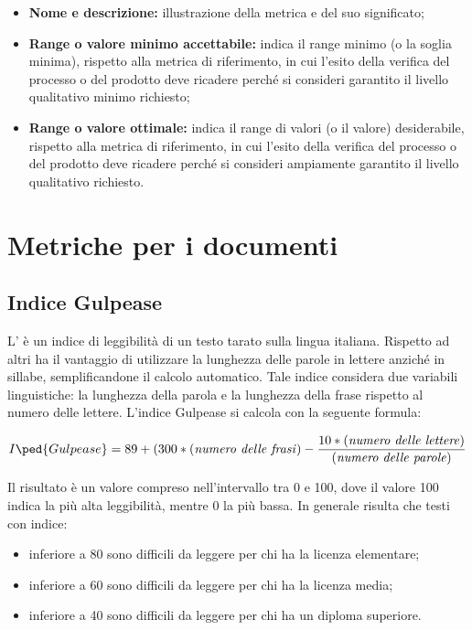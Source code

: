 \documentclass[openany,12pt,a4paper]{report}
\begin{document}
\begin{itemize}
    \item \textbf{Nome e descrizione:} illustrazione della metrica e del suo significato; 

    \item \textbf{Range o valore minimo accettabile:} indica il range minimo (o la soglia minima), rispetto alla metrica di riferimento, in cui l'esito della verifica del processo o del prodotto deve ricadere perché si consideri garantito il livello qualitativo minimo richiesto;

    \item \textbf{Range o valore ottimale:} indica il range di valori (o il valore) desiderabile, rispetto alla metrica di riferimento, in cui l'esito della verifica del processo o del prodotto deve ricadere perché si consideri ampiamente garantito il livello qualitativo richiesto.
\end{itemize}


\section{Metriche per i documenti}

\subsection{Indice Gulpease}

L’ è un indice di leggibilità di un testo tarato sulla lingua italiana. Rispetto ad altri ha il vantaggio di utilizzare la lunghezza delle parole in lettere anziché in sillabe, semplificandone il calcolo automatico. Tale indice considera due variabili linguistiche: la lunghezza della parola e la lunghezza della frase rispetto al numero delle lettere. L'indice Gulpease si calcola con la seguente formula:

\[ I\ped{Gulpease} = 89 + (300*(\textrm{\textit{numero delle frasi}}) - \frac{10*(\textrm{\textit{numero delle lettere}})}{(\textrm{\textit{numero delle parole}})} \]

Il risultato è un valore compreso nell’intervallo tra 0 e 100, dove il valore 100 indica la
più alta leggibilità, mentre 0 la più bassa. In generale risulta che testi con indice:

\begin{itemize}
    \item inferiore a 80 sono difficili da leggere per chi ha la licenza elementare; 
    \item inferiore a 60 sono difficili da leggere per chi ha la licenza media;
    \item inferiore a 40 sono difficili da leggere per chi ha un diploma superiore.
\end{itemize}
\end{document}
